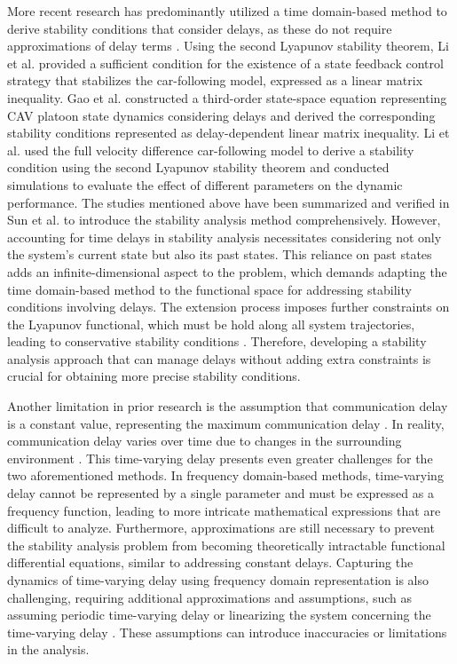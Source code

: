 \documentclass[a4paper]{cas-sc}
\begin{document}
More recent research has predominantly utilized a time domain-based method to derive stability conditions that consider delays, as these do not require approximations of delay terms \citep{no2000lyapunov,sadri2012lateral}. Using the second Lyapunov stability theorem, Li et al. \citep{LI20141739} provided a sufficient condition for the existence of a state feedback control strategy that stabilizes the car-following model, expressed as a linear matrix inequality. Gao et al. \citep{gao2016robust} constructed a third-order state-space equation representing CAV platoon state dynamics considering delays and derived the corresponding stability conditions represented as delay-dependent linear matrix inequality. Li et al. \citep{li2010lyapunov, li2013stability} used the full velocity difference car-following model to derive a stability condition using the second Lyapunov stability theorem and conducted simulations to evaluate the effect of different parameters on the dynamic performance. The studies mentioned above have been summarized and verified in Sun et al. \citep{sun_stability_2018} to introduce the stability analysis method comprehensively. However, accounting for time delays in stability analysis necessitates considering not only the system's current state but also its past states. This reliance on past states adds an infinite-dimensional aspect to the problem, which demands adapting the time domain-based method to the functional space for addressing stability conditions involving delays. The extension process imposes further constraints on the Lyapunov functional, which must be hold along all system trajectories, leading to conservative stability conditions \citep{fridman2006descriptor, wang2016fuzzy, lian2020dissipativity}. Therefore, developing a stability analysis approach that can manage delays without adding extra constraints is crucial for obtaining more precise stability conditions.


Another limitation in prior research is the assumption that communication delay is a constant value, representing the maximum communication delay \citep{feyzmahdavian2012optimal,liu2001effects}. In reality, communication delay varies over time due to changes in the surrounding environment \citep{yang2021time,fiengo2019distributed}. This time-varying delay presents even greater challenges for the two aforementioned methods. In frequency domain-based methods, time-varying delay cannot be represented by a single parameter and must be expressed as a frequency function, leading to more intricate mathematical expressions that are difficult to analyze. Furthermore, approximations are still necessary to prevent the stability analysis problem from becoming theoretically intractable functional differential equations, similar to addressing constant delays. Capturing the dynamics of time-varying delay using frequency domain representation is also challenging, requiring additional approximations and assumptions, such as assuming periodic time-varying delay \citep{louarroudi2014frequency} or linearizing the system concerning the time-varying delay \citep{otto2016frequency}. These assumptions can introduce inaccuracies or limitations in the analysis.
\end{document}
